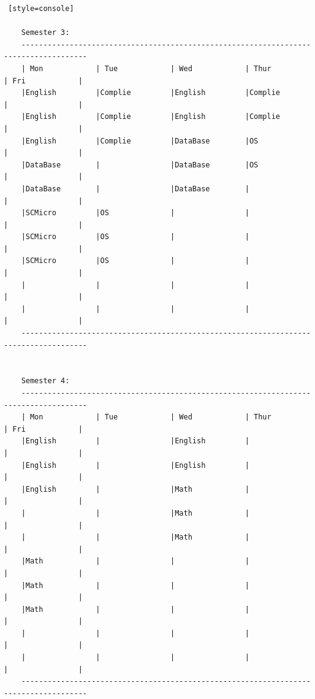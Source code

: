 \begin{lstlisting} [style=console]
    
    Semester 3: 
    -------------------------------------------------------------------------------------
    | Mon            | Tue            | Wed            | Thur           | Fri            |
    |English         |Complie         |English         |Complie         |                |
    |English         |Complie         |English         |Complie         |                |
    |English         |Complie         |DataBase        |OS              |                |
    |DataBase        |                |DataBase        |OS              |                |
    |DataBase        |                |DataBase        |                |                |
    |SCMicro         |OS              |                |                |                |
    |SCMicro         |OS              |                |                |                |
    |SCMicro         |OS              |                |                |                |
    |                |                |                |                |                |
    |                |                |                |                |                |
    -------------------------------------------------------------------------------------
    
    
    Semester 4: 
    -------------------------------------------------------------------------------------
    | Mon            | Tue            | Wed            | Thur           | Fri            |
    |English         |                |English         |                |                |
    |English         |                |English         |                |                |
    |English         |                |Math            |                |                |
    |                |                |Math            |                |                |
    |                |                |Math            |                |                |
    |Math            |                |                |                |                |
    |Math            |                |                |                |                |
    |Math            |                |                |                |                |
    |                |                |                |                |                |
    |                |                |                |                |                |
    -------------------------------------------------------------------------------------
    

\end{lstlisting}
